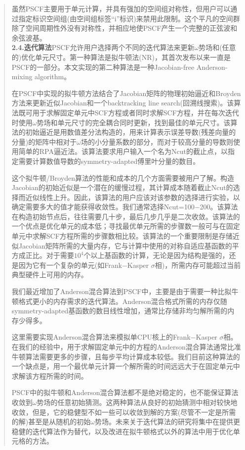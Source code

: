 \documentclass{article}
\begin{document}
\begin{CJK}{UTF8}{gkai}
\begin{quotation}
虽然PSCF主要用于单元计算，并具有强加的空间组对称性，但用户可以通过指定标识空间组(由空间组标签“i”标识)来禁用此限制。这个平凡的空间群除了空间周期性外没有对称性，并相应地使PSCF产生一个完整的正弦波和余弦波基。\\
\textbf{2.4.迭代算法}PSCF允许用户选择两个不同的迭代算法来更新$\omega$势场和(任意的)优化单元尺寸。第一种算法是拟牛顿法(NR)，其首次发布以来一直是PSCF的一部分。本文实现的第二种算法是一种Jacobian-free Anderson-mixing algorithm。

在PSCF中实现的拟牛顿方法结合了Jacobian矩阵的物理初始逼近和Broyden方法来更新近似Jacobian和一个backtracking line  search(回溯线搜索)。该算法既可用于求解固定单元中SCF方程或者同时求解SCF方程，并在每次迭代时使用$\omega$势场和单元尺寸的完全耦合同时更新，找到最佳的单元尺寸。该算法的初始逼近是用数值差分法构造的，用来计算表示误差导数(残差向量的分量)的矩阵中相对于$\omega$场的小分量系数的部分，而对于较高分量的导数则使用简单的RPA逼近法。该算法要求用户输入一个名为Ncut的截止点，以指定需要计算数值导数的symmetry-adapted傅里叶分量的数目。

这个拟牛顿/Broyden算法的性能和成本的几个方面需要被用户了解。构造Jacobian的初始近似是一个潜在的缓慢过程，其计算成本随着截止Ncut的选择而近似线性上升。因此，该算法的用户应该对该参数的选择进行实验，以确定需要多大的值才能获得收敛性。我们通常选择Ncut=100−200。该算法在构造初始节点后，往往需要几十步，最后几步几乎是二次收敛。该算法的一个优点是优化单元的成本低；寻找最优单元所需的步骤数一般可与在固定单元中求解SCF方程所需的步骤数相比较。该算法的一个重要限制是存储近似Jacobian矩阵所需的大量内存，它与计算中使用的对称自适应基函数的平方成正比。对于需要$10^4$个以上基函数的计算，无论是因为结构是强的，还是因为它有一个复杂的单元(如Frank−Kasper $\sigma$相)，所需内存可能超过当前典型硬件上可用的内存。

我们最近增加了Anderson混合算法到PSCF中，主要是由于需要一种比拟牛顿格式更小的内存需求的迭代算法。Anderson混合格式所需的内存仅随symmetry-adapted基函数的数目线性增加，通常比存储非均匀解所需的内存少得多。

这里需要实现Anderson混合算法来模拟单CPU核上的Frank−Kasper $\sigma$相。在我们的经验中，用于求解固定单元中的方程的Anderson混合算法通常比准牛顿算法需要更多的步骤，且每步平均计算成本较低。我们目前这种算法的一个缺点是，用一个最优单元计算一个解所需的时间远远大于在固定单元中求解该方程所需的时间。

PSCF中的拟牛顿和Anderson混合算法都不是绝对稳定的，也不能保证算法收敛到$\omega$势场的任意初始猜测。这两种算法从良好的初始猜测中相对较快地收敛，但是，它的稳健型不如一些可以收敛到解的方案(尽管不一定是所需的解)甚至是从随机的初始$\omega$势场。未来关于迭代算法的研究将集中在提供更稳健的迭代算法作为替代，以及改进在拟牛顿格式以外的算法中用于优化单元格的方法。


\end{quotation}
\end{CJK}
\end{document}
